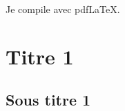 \documentclass[10pt]{article}
\begin{document}



\begin{warn}
Je compile avec pdfLaTeX.
\end{warn}
\setlength{\parskip}{0ex plus 0.2ex minus 0ex}
 \renewcommand{\contentsname}{}
 \renewcommand{\baselinestretch}{1}

\tableofcontents

 \renewcommand{\baselinestretch}{1.2}
\setlength{\parskip}{2ex plus 0.5ex minus 0.2ex}



\section{Titre 1}

\subsection{Sous titre 1}
\begin{thebibliography}{2}
\end{thebibliography}
\end{document}
